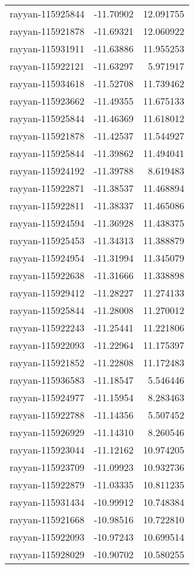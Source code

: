 \documentclass[
]{article}
\begin{document}
\begin{longtable}[]{@{}lrr@{}}
rayyan-115925844 & -11.70902 & 12.091755 \\
rayyan-115921878 & -11.69321 & 12.060922 \\
rayyan-115931911 & -11.63886 & 11.955253 \\
rayyan-115922121 & -11.63297 & 5.971917 \\
rayyan-115934618 & -11.52708 & 11.739462 \\
rayyan-115923662 & -11.49355 & 11.675133 \\
rayyan-115925844 & -11.46369 & 11.618012 \\
rayyan-115921878 & -11.42537 & 11.544927 \\
rayyan-115925844 & -11.39862 & 11.494041 \\
rayyan-115924192 & -11.39788 & 8.619483 \\
rayyan-115922871 & -11.38537 & 11.468894 \\
rayyan-115922811 & -11.38337 & 11.465086 \\
rayyan-115924594 & -11.36928 & 11.438375 \\
rayyan-115925453 & -11.34313 & 11.388879 \\
rayyan-115924954 & -11.31994 & 11.345079 \\
rayyan-115922638 & -11.31666 & 11.338898 \\
rayyan-115929412 & -11.28227 & 11.274133 \\
rayyan-115925844 & -11.28008 & 11.270012 \\
rayyan-115922243 & -11.25441 & 11.221806 \\
rayyan-115922093 & -11.22964 & 11.175397 \\
rayyan-115921852 & -11.22808 & 11.172483 \\
rayyan-115936583 & -11.18547 & 5.546446 \\
rayyan-115924977 & -11.15954 & 8.283463 \\
rayyan-115922788 & -11.14356 & 5.507452 \\
rayyan-115926929 & -11.14310 & 8.260546 \\
rayyan-115923044 & -11.12162 & 10.974205 \\
rayyan-115923709 & -11.09923 & 10.932736 \\
rayyan-115922879 & -11.03335 & 10.811235 \\
rayyan-115931434 & -10.99912 & 10.748384 \\
rayyan-115921668 & -10.98516 & 10.722810 \\
rayyan-115922093 & -10.97243 & 10.699514 \\
rayyan-115928029 & -10.90702 & 10.580255 \\

\end{longtable}
\end{document}
